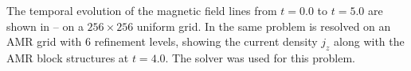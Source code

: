The temporal evolution of the magnetic field lines from $t=0.0$ to $t=5.0$ are 
shown in  --  
on a $256\times 256$ uniform grid. 
In  the same problem
is resolved on an AMR grid with 6 refinement levels, showing
the current density $j_z$ along with the AMR block structures at $t=4.0$.
The  solver was used for this problem.


